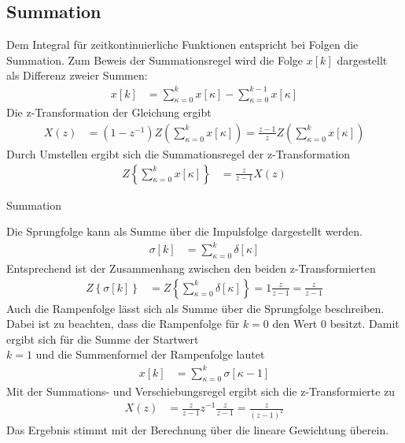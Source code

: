 \subsection{Summation}\label{sec:summation}

Dem Integral für zeitkontinuierliche Funktionen entspricht bei Folgen die Summation. Zum Beweis der Summationsregel wird die Folge \(x[k]\) dargestellt als Differenz zweier Summen:
\begin{align}
x[ k] &= \sum\limits_{\kappa = 0}^{k}{x[\kappa] -}\sum\limits_{\kappa = 0}^{k - 1}{x[\kappa]} \label{eq:5.61}
\end{align}
Die z-Transformation der Gleichung ergibt
\begin{align}
X(z) &= \left( 1 - z^{- 1} \right)  Z\left( \sum\limits_{\kappa = 0}^{k}{x[\kappa]} \right) = \frac{z - 1}{z}  Z\left( \sum\limits_{\kappa = 0}^{k}{x[\kappa]} \right) \label{eq:5.62}
\end{align}
Durch Umstellen ergibt sich die Summationsregel der z-Transformation
\begin{align}
Z\left\{ \sum\limits_{\kappa = 0}^{k}{x[\kappa]} \right\} &= \frac{z}{z - 1}  X(z) \label{eq:5.63}
\end{align}
\begin{example}{Summation}
\label{example:beispiel-summation}

Die Sprungfolge kann als Summe über die Impulsfolge dargestellt werden.
\begin{align*}
\sigma[ k] &= \sum\limits_{\kappa = 0}^{k}{\delta[\kappa]} 
\end{align*}
Entsprechend ist der Zusammenhang zwischen den beiden z-Transformierten
\begin{align*}
Z\left\{ \sigma[ k] \right\} &= Z\left\{ \sum\limits_{\kappa = 0}^{k}{\delta[\kappa]} \right\} = 1  \frac{z}{z - 1} = \frac{z}{z - 1} 
\end{align*}
Auch die Rampenfolge lässt sich als Summe über die Sprungfolge beschreiben. Dabei ist zu beachten, dass die Rampenfolge für \(k = 0\) den Wert 0 besitzt. Damit ergibt sich für die Summe der Startwert\\
\(k = 1\) und die Summenformel der Rampenfolge lautet
\begin{align*}
x[ k] &= \sum\limits_{\kappa = 0}^{k}{\sigma[\kappa - 1]} 
\end{align*}
Mit der Summations- und Verschiebungsregel ergibt sich die z-Transformierte zu
\begin{align*}
X(z) &= \frac{z}{z - 1}  z^{- 1}  \frac{z}{z - 1} = \frac{z}{(z - 1)^{2}} 
\end{align*}
Das Ergebnis stimmt mit der Berechnung über die lineare Gewichtung überein.

\end{example}

